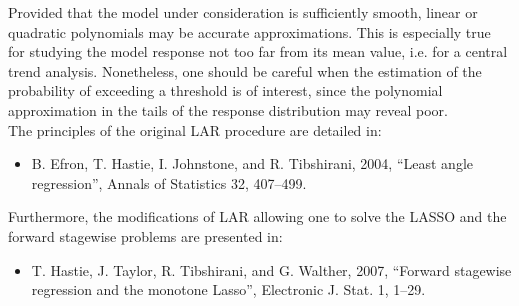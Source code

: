            {
              Provided that the model under consideration is sufficiently smooth, linear or quadratic polynomials may be accurate approximations. This is especially true for studying the model response not too far from its mean value, i.e. for a central trend analysis. Nonetheless, one should be careful when the estimation of the probability of exceeding a threshold is of interest, since the polynomial approximation in the tails of the response distribution may reveal poor. \\

              The principles of the original LAR procedure are detailed in:
              \begin{itemize}
              \item B. Efron, T. Hastie, I. Johnstone, and R. Tibshirani, 2004, ``Least angle regression'', Annals of
                Statistics 32, 407--499.
              \end{itemize}
              Furthermore, the modifications of LAR allowing one to solve the LASSO and the forward stagewise problems are presented in:
              \begin{itemize}
              \item T. Hastie, J. Taylor, R. Tibshirani, and G. Walther, 2007, ``Forward stagewise regression and
                the monotone Lasso'', Electronic J. Stat. 1, 1--29.
              \end{itemize}
            }
